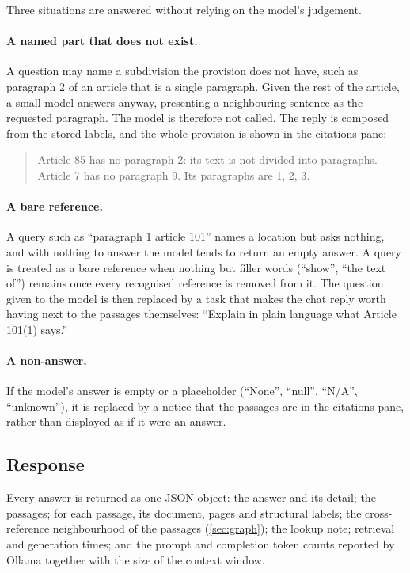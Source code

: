 Three situations are answered without relying on the model's judgement.

\paragraph{A named part that does not exist.} A question may name a
subdivision the provision does not have, such as paragraph 2 of an article
that is a single paragraph. Given the rest of the article, a small model
answers anyway, presenting a neighbouring sentence as the requested paragraph.
The model is therefore not called. The reply is composed from the stored
labels, and the whole provision is shown in the citations pane:

\begin{quote}\small
Article 85 has no paragraph 2: its text is not divided into paragraphs.\\
Article 7 has no paragraph 9. Its paragraphs are 1, 2, 3.
\end{quote}

\paragraph{A bare reference.} A query such as ``paragraph 1 article 101''
names a location but asks nothing, and with nothing to answer the model tends
to return an empty answer. A query is treated as a bare reference when nothing
but filler words (``show'', ``the text of'') remains once every recognised
reference is removed from it. The question given to the model is then replaced
by a task that makes the chat reply worth having next to the passages
themselves: ``Explain in plain language what Article 101(1) says.''

\paragraph{A non-answer.} If the model's answer is empty or a placeholder
(``None'', ``null'', ``N/A'', ``unknown''), it is replaced by a notice that
the passages are in the citations pane, rather than displayed as if it were
an answer.

\subsection{Response}

Every answer is returned as one JSON object: the answer and its detail; the
passages; for each passage, its document, pages and structural labels; the
cross-reference neighbourhood of the passages (\cref{sec:graph}); the lookup
note; retrieval and generation times; and the prompt and completion token
counts reported by Ollama together with the size of the context window.

